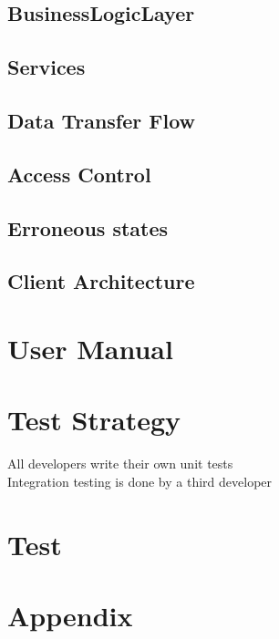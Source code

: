 \documentclass{report}
\begin{document}


\section{BusinessLogicLayer}



\section{Services}


\section{Data Transfer Flow}



% 

\section{Access Control}



\section{Erroneous states}





\section{Client Architecture}




\chapter{User Manual}

\chapter{Test Strategy}
All developers write their own unit tests \\
Integration testing is done by a third developer

\chapter{Test}

\chapter{Appendix}
\end{document}
